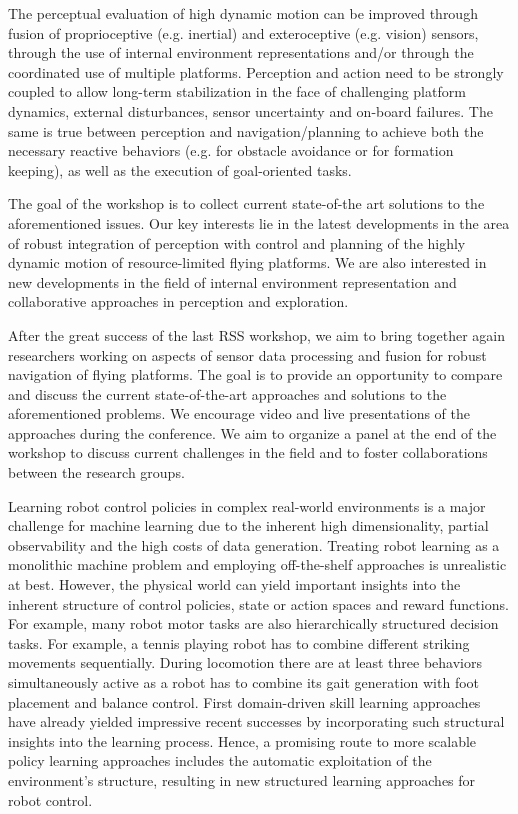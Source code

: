 \begin{spacing}{1.0}
{The perceptual evaluation of high dynamic motion can be improved through fusion of proprioceptive (e.g. inertial) and exteroceptive (e.g. vision) sensors, through the use of internal environment representations and/or through the coordinated use of multiple platforms. Perception and action need to be strongly coupled to allow long-term stabilization in the face of challenging platform dynamics, external disturbances, sensor uncertainty and on-board failures. The same is true between perception and navigation/planning to achieve both the necessary reactive behaviors (e.g. for obstacle avoidance or for formation keeping), as well as the execution of goal-oriented tasks.

The goal of the workshop is to collect current state-of-the art solutions to the aforementioned issues. Our key interests lie in the latest developments in the area of robust integration of perception with control and planning of the highly dynamic motion of resource-limited flying platforms. We are also interested in new developments in the field of internal environment representation and collaborative approaches in perception and exploration.

After the great success of the last RSS workshop, we aim to bring together again researchers working on aspects of sensor data processing and fusion for robust navigation of flying platforms. The goal is to provide an opportunity to compare and discuss the current state-of-the-art approaches and solutions to the aforementioned problems. We encourage video and live presentations of the approaches during the conference. We aim to organize a panel at the end of the workshop to discuss current challenges in the field and to foster collaborations between the research groups.
}



{
Learning robot control policies in complex real-world environments is a major challenge for machine learning due to the inherent high dimensionality, partial observability and the high costs of data generation. Treating robot learning as a monolithic machine problem and employing off-the-shelf approaches is unrealistic at best. However, the physical world can yield important insights into the inherent structure of control policies, state or action spaces and reward functions. For example, many robot motor tasks are also hierarchically structured decision tasks. For example, a tennis playing robot has to combine different striking movements sequentially. During locomotion there are at least three behaviors simultaneously active as a robot has to combine its gait generation with foot placement and balance control. First domain-driven skill learning approaches have already yielded impressive recent successes by incorporating such structural insights into the learning process. Hence, a promising route to more 
scalable policy learning approaches includes the automatic exploitation of the environment's structure, resulting in new structured learning approaches for robot control.

}
\end{spacing}
